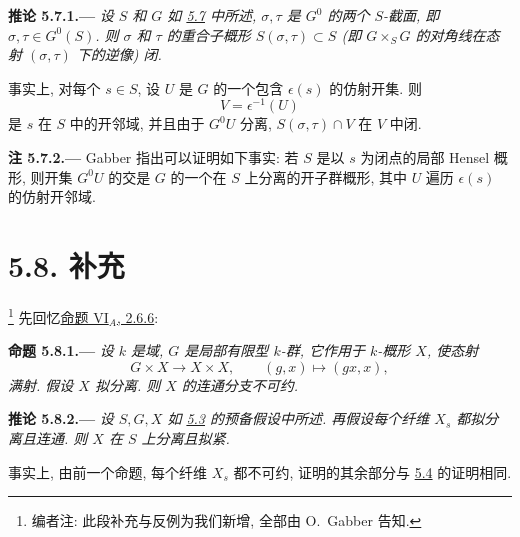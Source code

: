 
\medskip
{}\label{cor:sga3-VIB-5.7.1}%
\noindent\textbf{推论 5.7.1.---}
\emph{设 \(S\) 和 \(G\) 如 \hyperref[thm:sga3-VIB-5.7]{5.7} 中所述,
\(\sigma,\tau\) 是 \(G^0\) 的两个 \(S\)-截面,
即 \(\sigma,\tau\in G^0(S)\).
则 \(\sigma\) 和 \(\tau\) 的重合子概形
\(S(\sigma,\tau)\subset S\)
\textup{(即 \(G\times_S G\) 的对角线在态射 \((\sigma,\tau)\) 下的逆像)} 闭.}

事实上, 对每个 \(s\in S\), 设 \(U\) 是 \(G\)
的一个包含 \(\epsilon(s)\) 的仿射开集. 则
\[
  V=\epsilon^{-1}(U)
\]
是 \(s\) 在 \(S\) 中的开邻域,
并且由于 \(G^0U\) 分离, \(S(\sigma,\tau)\cap V\) 在 \(V\) 中闭.

\medskip
{}\label{rem:sga3-VIB-5.7.2}%
\noindent\textbf{注 5.7.2.---}
Gabber 指出可以证明如下事实: 若 \(S\) 是以 \(s\) 为闭点的局部 Hensel 概形,
则开集 \(G^0U\) 的交是 \(G\) 的一个在 \(S\) 上分离的开子群概形,
其中 \(U\) 遍历 \(\epsilon(s)\) 的仿射开邻域.

\section*{5.8. 补充}
\label{sec:sga3-VIB-5.8}%

\noindent\footnote{\label{note:sga3-VIB-47}编者注: 此段补充与反例为我们新增,
全部由 O.\ Gabber 告知.}%
先回忆\hyperref[prop:sga3-VIA-2.6.6]{命题 VI\(_A\), 2.6.6}:

\medskip
{}\label{prop:sga3-VIB-5.8.1}%
\noindent\textbf{命题 5.8.1.---}
\emph{设 \(k\) 是域, \(G\) 是局部有限型 \(k\)-群,
它作用于 \(k\)-概形 \(X\), 使态射}
\[
  G\times X\longrightarrow X\times X,
  \qquad (g,x)\longmapsto(gx,x),
\]
\emph{满射. 假设 \(X\) 拟分离. 则 \(X\) 的连通分支不可约.}

\medskip
{}\label{cor:sga3-VIB-5.8.2}%
\noindent\textbf{推论 5.8.2.---}
\emph{设 \(S,G,X\) 如 \hyperref[thm:sga3-VIB-5.3]{5.3} 的预备假设中所述.
再假设每个纤维 \(X_s\) 都拟分离且连通.
则 \(X\) 在 \(S\) 上分离且拟紧.}

事实上, 由前一个命题, 每个纤维 \(X_s\) 都不可约,
证明的其余部分与 \hyperref[cor:sga3-VIB-5.4]{5.4} 的证明相同.

